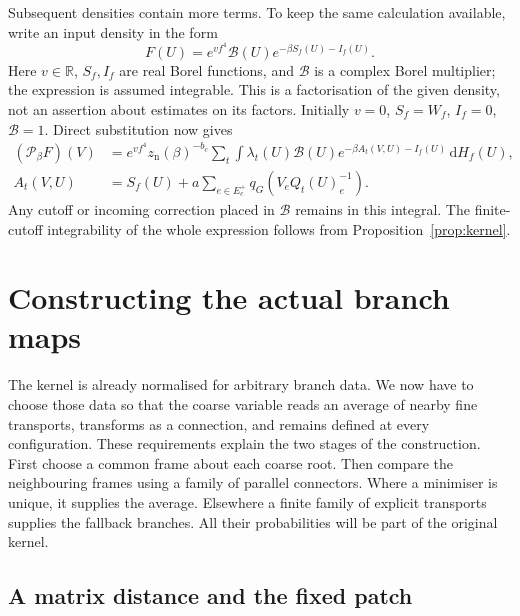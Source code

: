 \documentclass[11pt,reqno]{amsart}
\numberwithin{equation}{section}
\theoremstyle{definition}
\theoremstyle{remark}
\newcommand{\R}{\mathbb R}
\newcommand{\dd}{\mathrm d}
\begin{document}
Subsequent densities contain more terms. To keep the same calculation
available, write an input density in the form
\begin{equation}
       F(U)=e^{vf^4}\mathcal B(U)e^{-\beta S_f(U)-I_f(U)}.
 \label{eq:general-input}
\end{equation}
Here \(v\in\R\), \(S_f,I_f\) are real Borel functions, and
\(\mathcal B\) is a complex Borel multiplier; the expression is
assumed integrable. This is a factorisation of the given density,
not an assertion about estimates on its factors. Initially
\(v=0\), \(S_f=W_f\), \(I_f=0\), \(\mathcal B=1\).
Direct substitution now gives
\begin{align}
 (\mathcal P_\beta F)(V)
 &=e^{vf^4}z_{\mathrm n}(\beta)^{-b_c}
       \sum_t\int\lambda_t(U)\mathcal B(U)
                    e^{-\beta A_t(V,U)-I_f(U)}\,\dd H_f(U),
       \label{eq:full-block-integral}\\
 A_t(V,U)&=S_f(U)+a\sum_{e\in E_c^+}q_G(V_eQ_t(U)_e^{-1}).
       \label{eq:general-action}
\end{align}
Any cutoff or incoming correction placed in \(\mathcal B\) remains
in this integral. The finite-cutoff integrability of the whole
expression follows from Proposition~\ref{prop:kernel}.

\section{Constructing the actual branch maps}
\label{sec:actual-branches}

The kernel is already normalised for arbitrary branch data.
We now have to choose those data so that the coarse variable reads
an average of nearby fine transports, transforms as a connection,
and remains defined at every configuration. These requirements
explain the two stages of the construction. First choose a common
frame about each coarse root. Then compare the neighbouring frames
using a family of parallel connectors. Where a minimiser is unique,
it supplies the average. Elsewhere a finite family of explicit
transports supplies the fallback branches. All their probabilities
will be part of the original kernel.

\subsection{A matrix distance and the fixed patch}
\end{document}
